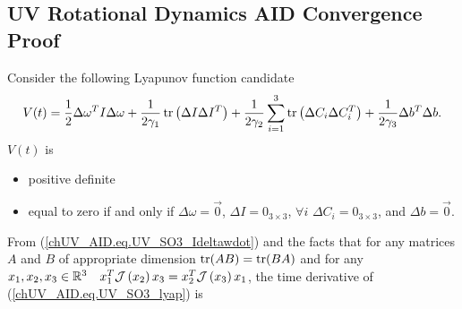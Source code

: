\subsection{\ac{UV} Rotational Dynamics \ac{AID} Convergence Proof}
\label{chUV_AID.sec.UVSO3_AID_convProof}


Consider the following Lyapunov function candidate
%
\begin{equation}\label{chUV_AID.eq.UV_SO3_lyap}
V(t)=\frac{1}{2}\Delta \omega^{T} I \Delta \omega +
     \frac{1}{2\gamma_1}\operatorname{tr}\left(\Delta I \Delta I^{T}\right)+
     \frac{1}{2\gamma_2}\sum_{i=1}^3\operatorname{tr}\left(\Delta C_i \Delta
       C_i^{T}\right)+
     \frac{1}{2\gamma_3}\Delta b^T \Delta b.
\end{equation}
%
\noindent $V(t)$ is
%
\begin{itemize}
\item positive definite
\item equal to zero if and only if $\Delta \omega=\vec{0}$, $\Delta
  I=0_{3\times 3}$, $\forall i$ $\Delta C_i=0_{3\times 3}$, and $\Delta b=\vec{0}$.
\end{itemize}
%
\noindent From (\ref{chUV_AID.eq.UV_SO3_Ideltawdot}) and the facts
that for any matrices $A$ and $B$ of appropriate dimension
$\operatorname{tr}(AB)=\operatorname{tr}(BA)$ and for any $x_1,x_2,x_3\in\mathbb{R}^3 \quad
x_1^T\mathcal{J}\left( x_2 \right)x_3=x_2^T\mathcal{J}\left( x_3 \right)x_1$, the time
derivative of (\ref{chUV_AID.eq.UV_SO3_lyap}) is
%
